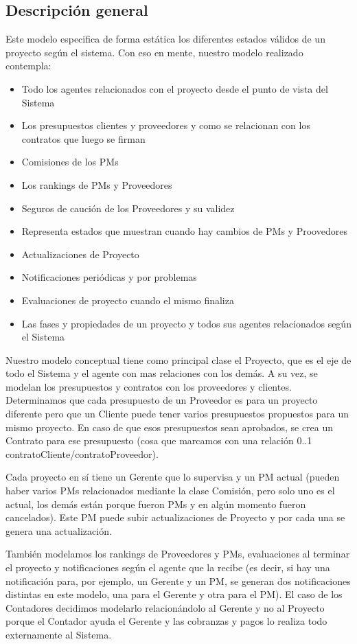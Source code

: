 \subsection{Descripción general}

Este modelo especifica de forma estática los diferentes estados válidos de un proyecto según el sistema. Con eso en mente, nuestro modelo realizado contempla:

\begin{itemize}
	\item Todo los agentes relacionados con el proyecto desde el punto de vista del Sistema
	\item Los presupuestos clientes y proveedores y como se relacionan con los contratos que luego se firman
	\item Comisiones de los PMs
	\item Los rankings de PMs y Proveedores
	\item Seguros de caución de los Proveedores y su validez
	\item Representa estados que muestran cuando hay cambios de PMs y Proovedores
	\item Actualizaciones de Proyecto
	\item Notificaciones periódicas y por problemas
	\item Evaluaciones de proyecto cuando el mismo finaliza
	\item Las fases y propiedades de un proyecto y todos sus agentes relacionados según el Sistema
\end{itemize}

Nuestro modelo conceptual tiene como principal clase el Proyecto, que es el eje de todo el Sistema y el agente con mas relaciones con los demás. A su vez, se modelan los presupuestos y contratos con los proveedores y clientes. Determinamos que cada presupuesto de un Proveedor es para un proyecto diferente pero que un Cliente puede tener varios presupuestos propuestos para un mismo proyecto. En caso de que esos presupuestos sean aprobados, se crea un Contrato para ese presupuesto (cosa que marcamos con una relación 0..1 contratoCliente/contratoProveedor).

Cada proyecto en sí tiene un Gerente que lo supervisa y un PM actual (pueden haber varios PMs relacionados mediante la clase Comisión, pero solo uno es el actual, los demás están porque fueron PMs y en algún momento fueron cancelados). Este PM puede subir actualizaciones de Proyecto y por cada una se genera una actualización.

También modelamos los rankings de Proveedores y PMs, evaluaciones al terminar el proyecto y notificaciones según el agente que la recibe (es decir, si hay una notificación para, por ejemplo, un Gerente y un PM, se generan dos notificaciones distintas en este modelo, una para el Gerente y otra para el PM).
El caso de los Contadores decidimos modelarlo relacionándolo al Gerente y no al Proyecto porque el Contador ayuda el Gerente y las cobranzas y pagos lo realiza todo externamente al Sistema.

